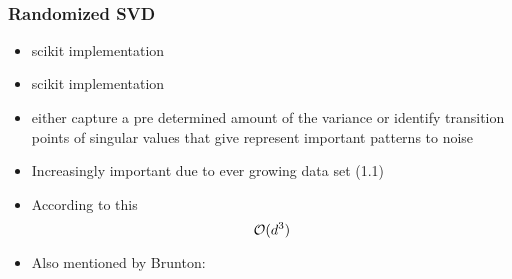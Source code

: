 \ \clearpage
\ \clearpage


\subsubsection{Randomized SVD}

\begin{itemize}
	\item \cite{halko2011finding} scikit implementation
	\item \cite{martinsson2011randomized} scikit implementation
	\item \cite{brunton2019data} either capture a pre determined amount of the variance or identify transition points of singular values that give represent important patterns to noise
	\item Increasingly important due to ever growing data set \cite{brunton2019data} (1.1)
	\item According to this \cite{HandsOnMLCh8}
	$$\mathcal{O}(d^3)$$
	\item Also mentioned by Brunton: \cite{sarlos2006improved}
\end{itemize}

\ \clearpage
\ \clearpage

